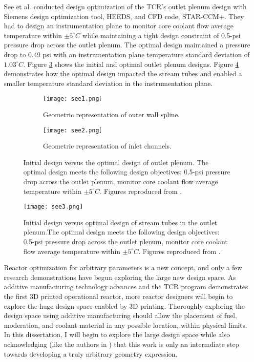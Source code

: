 See et al. \cite{see_design_2022} conducted design optimization of the 
\gls{TCR}'s outlet plenum design with Siemens design optimization tool, HEEDS,
and \gls{CFD} code, STAR-CCM+. 
They had to design an instrumentation plane to monitor core coolant flow average 
temperature within $\pm 5 ^{\circ}C$ while maintaining a tight design 
constraint of 0.5-psi pressure drop across the outlet plenum.
The optimal design maintained a pressure drop to 0.49 psi with an instrumentation 
plane temperature standard deviation of $1.03^{\circ}C$. 
Figure \ref{fig:compare-outlet-plenum} shows the initial and optimal outlet plenum 
designs. 
Figure \ref{fig:see3} demonstrates how the optimal design impacted the stream 
tubes and enabled a smaller temperature standard deviation in the 
instrumentation plane. 
\begin{figure}[htb!]
    \centering
    \begin{subfigure}{0.49\textwidth}
        \texttt{[image: see1.png]}
        \caption{Geometric representation of outer wall spline.}
        \label{fig:see1} 
    \end{subfigure}
    \begin{subfigure}{0.49\textwidth}
        \texttt{[image: see2.png]}
        \caption{Geometric representation of inlet channels.}
        \label{fig:see2} 
    \end{subfigure}
    \caption{Initial design versus the optimal design of outlet plenum. The optimal design 
    meets the following design objectives: 0.5-psi pressure drop across the outlet plenum, 
    monitor core coolant flow average temperature within $\pm 5 ^{\circ}C$.
    Figures reproduced from \cite{betzler_transformational_2020}.}
    \label{fig:compare-outlet-plenum}
\end{figure}
\begin{figure}[htb!]
    \centering
    \texttt{[image: see3.png]} 
    \caption{Initial design versus optimal design of stream tubes in the outlet 
    plenum.The optimal design meets the following design objectives: 0.5-psi pressure 
    drop across the outlet plenum, monitor core coolant flow average temperature 
    within $\pm 5 ^{\circ}C$.
    Figures reproduced from \cite{see_design_2022}.}
    \label{fig:see3}
\end{figure}

Reactor optimization for arbitrary parameters is a new concept, and only a few 
research demonstrations have begun exploring the large new design space. 
As additive manufacturing technology advances and the \gls{TCR} program 
demonstrates the first 3D printed operational reactor, more reactor designers 
will begin to explore the huge design space enabled by 3D printing. 
Thoroughly exploring the design space using additive manufacturing should allow 
the placement of fuel, moderation, and coolant material in any possible location, 
within physical limits. 
In this dissertation, I will begin to explore the large design space while 
also acknowledging (like the authors in \cite{sobes_artificial_2020}) that 
this work is only an intermdiate step towards developing a truly arbitrary 
geometry expression. 


